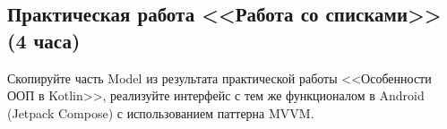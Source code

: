 \subsection{Практическая работа <<Работа со списками>> (4 часа)}

Скопируйте часть Model из результата практической работы <<Особенности ООП в Kotlin>>, реализуйте интерфейс с тем же функционалом в Android (Jetpack Compose)
с использованием паттерна MVVM.

